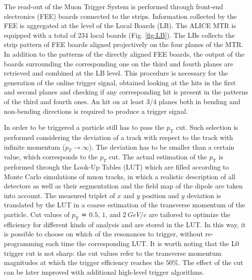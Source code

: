The read-out of the Muon Trigger System is performed through front-end electronics (FEE) boards connected to the strips.
Information collected by the FEE is aggregated at the level of the Local Boards (LB).
The ALICE MTR is equipped with a total of 234 local boards (Fig. \ref{fig:LB}).
The LBs collects the strip pattern of FEE boards aligned projectively on the four planes of the MTR.
In addition to the patterns of the directly aligned FEE boards, the output of the boards surrounding the corresponding one on the third and fourth planes are retrieved and combined at the LB level.
This procedure is necessary for the generation of the online trigger signal, obtained looking at the hits in the first and second planes and checking if any corresponding hit is present in the patterns of the third and fourth ones.
An hit on at least $3/4$ planes both in bending and non-bending directions is required to produce a trigger signal.

In order to be triggered a particle still has to pass the $p_{\mathrm{T}}$ cut.
Such selection is performed considering the deviation of a track with respect to the track with infinite momentum ($p_T \rightarrow \infty$).
The deviation has to be smaller than a certain value, which corresponds to the $p_T$ cut.
The actual estimation of the $p_{\mathrm{T}}$ is performed through the Look-Up Tables (LUT) which are filled according to Monte Carlo simulations of muon tracks, in which a realistic description of all detectors as well as their segmentation and the field map of the dipole are taken into account.
The measured triplet of $x$ and $y$ position and $y$ deviation is translated by the LUT in a coarse estimation of the transverse momentum of the particle.
Cut values of $p_{\mathrm{T}}$ ≃ $0.5$, $1$, and $2\ GeV/c$ are tailored to optimize the efficiency for different kinds of analysis and are stored in the LUT.
In this way, it is possible to choose on which of the resonances to trigger, without re-programming each time the corresponding LUT. 
It is worth noting that the L0 trigger cut is not sharp: the cut values refer to the transverse momentum magnitudes at which the trigger efficiency reaches the $50\%$. 
The effect of the cut can be later improved with additional high-level trigger algorithms.